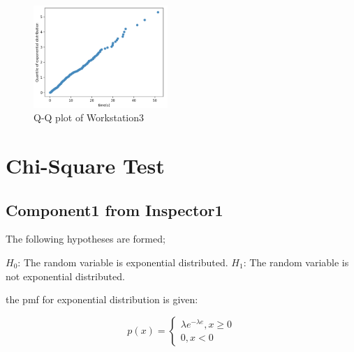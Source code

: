 \documentclass{article}
\begin{document}
\begin{figure}[htbp]
\begin{center}
\includegraphics[width=2in]{exp6.png}
\caption{Q-Q plot of Workstation3}
\label{exp6}
\end{center}
\end{figure}

\section{Chi-Square Test}
\subsection{Component1 from Inspector1}
The following hypotheses are formed;

$H_0$: The random variable is exponential distributed.
$H_1$: The random variable is not exponential distributed.

the pmf for exponential distribution is given:

\begin{equation}
p(x) = \left\{
\begin{array}{rl}
\lambda e^{-\lambda e}, x\geq 0\\
0, x<0
\end{array}
\right.
\end{equation}
\end{document}
